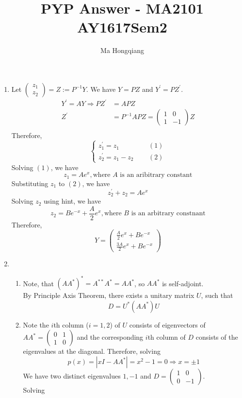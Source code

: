 \documentclass[12pt]{article}
\newcommand{\inv}{^{-1}}
\newcommand{\str}{^\ast}
\theoremstyle{definition}
\begin{document}
\title{PYP Answer - MA2101 AY1617Sem2}
\author{Ma Hongqiang}
\maketitle
\begin{enumerate}
  \item Let $\begin{pmatrix}z_1\\z_2\end{pmatrix}=Z:=P^{-1}Y$. We have $Y=PZ$ and $Y^\prime = PZ^\prime$.
  \begin{align*}
  Y^\prime = AY\Rightarrow PZ^\prime &= APZ\\
  Z^\prime &=P\inv APZ=\begin{pmatrix}1&0\\1&-1\end{pmatrix}Z\\
  \end{align*}
  Therefore, 
  \[
  \begin{cases}
  z_1^\prime = z_1&\;\;\;\;\;(1)\\
  z_2^\prime = z_1-z_2&\;\;\;\;\;(2)
  \end{cases}
  \]
  Solving $(1)$, we have
  \[
z_1=Ae^x, \text{where }A \text{ is an aribitrary constant}
  \]
Substituting $z_1$ to $(2)$, we have
\[
z^\prime_2+z_2=Ae^x
\]
Solving $z_2$ using hint, we have
\[
z_2=Be^{-x}+\frac{A}{2}e^x, \text{where }B\text{ is an arbitrary constnant}
\]
Therefore, 
\[
Y=\begin{pmatrix}\frac{A}{2}e^x+Be^{-x}\\\frac{3A}{2}e^x+Be^{-x}\end{pmatrix}
\]
\item \begin{enumerate}
\item Note, that $(AA\str)\str=A^{\ast\ast}A\str = AA\str$, so $AA\str$ is self-adjoint. \\By Principle Axis Theorem, there exists a unitary matrix $U$, such that
\[
D=U\str(AA\str)U
\] 
\item Note the $i$th column ($i=1,2$) of $U$ consists of eigenvectors of $AA\str=\begin{pmatrix}0&1\\1&0\end{pmatrix}$ and the corresponding $i$th column of $D$ consists of the eigenvalues at the diagonal. Therefore, solving
\[
p(x)=|xI-AA\str|=x^2-1=0\Rightarrow x=\pm 1
\]
We have two distinct eigenvalues $1, -1$ and $D=\begin{pmatrix}1&0\\0&-1\end{pmatrix}$.\\Solving

\end{enumerate}
\end{enumerate}
\end{document}
